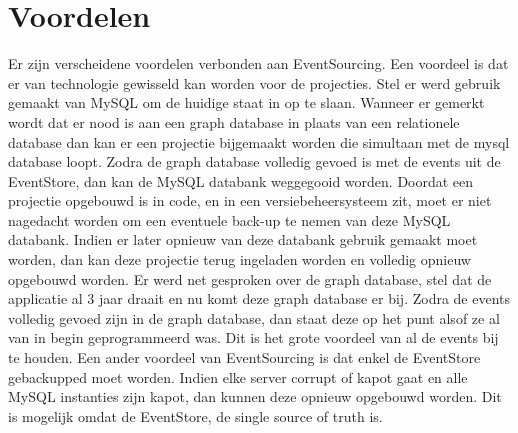 
\chapter{Voordelen}
\label{ch:voordelen}

Er zijn verscheidene voordelen verbonden aan EventSourcing. Een voordeel is dat er van technologie gewisseld kan worden voor de projecties. Stel er werd gebruik gemaakt van MySQL om de huidige staat in op te slaan. Wanneer er gemerkt wordt dat er nood is aan een graph database in plaats van een relationele database dan kan er een projectie bijgemaakt worden die simultaan met de mysql database loopt. Zodra de graph database volledig gevoed is met de events uit de EventStore, dan kan de MySQL databank weggegooid worden. Doordat een projectie opgebouwd is in code, en in een versiebeheersysteem zit, moet er niet nagedacht worden om een eventuele back-up te nemen van deze MySQL databank. Indien er later opnieuw van deze databank gebruik gemaakt moet worden, dan kan deze projectie terug ingeladen worden en volledig opnieuw opgebouwd worden.
Er werd net gesproken over de graph database, stel dat de applicatie al 3 jaar draait en nu komt deze graph database er bij. Zodra de events volledig gevoed zijn in de graph database, dan staat deze op het punt alsof ze al van in begin geprogrammeerd was. Dit is het grote voordeel van al de events bij te houden.
Een ander voordeel van EventSourcing is dat enkel de EventStore gebackupped moet worden. Indien elke server corrupt of kapot gaat en alle MySQL instanties zijn kapot, dan kunnen deze opnieuw opgebouwd worden. Dit is mogelijk omdat de EventStore, de single source of truth is.
